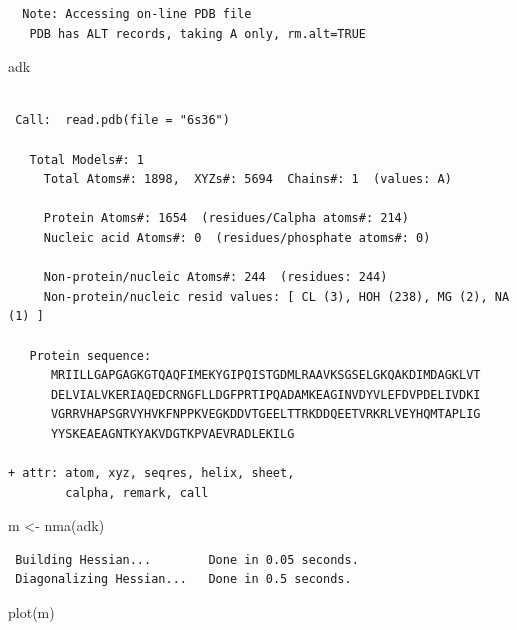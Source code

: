 \documentclass[
  letterpaper,
  DIV=11,
  numbers=noendperiod]{scrartcl}
\newenvironment{Shaded}{\begin{snugshade}}{\end{snugshade}}
\newcommand{\FunctionTok}[1]{\textcolor[rgb]{0.28,0.35,0.67}{#1}}
\newcommand{\NormalTok}[1]{\textcolor[rgb]{0.00,0.23,0.31}{#1}}
\newcommand{\OtherTok}[1]{\textcolor[rgb]{0.00,0.23,0.31}{#1}}
\begin{document}
\begin{verbatim}
  Note: Accessing on-line PDB file
   PDB has ALT records, taking A only, rm.alt=TRUE
\end{verbatim}

\begin{Shaded}
\begin{Highlighting}[]
\NormalTok{adk}
\end{Highlighting}
\end{Shaded}

\begin{verbatim}

 Call:  read.pdb(file = "6s36")

   Total Models#: 1
     Total Atoms#: 1898,  XYZs#: 5694  Chains#: 1  (values: A)

     Protein Atoms#: 1654  (residues/Calpha atoms#: 214)
     Nucleic acid Atoms#: 0  (residues/phosphate atoms#: 0)

     Non-protein/nucleic Atoms#: 244  (residues: 244)
     Non-protein/nucleic resid values: [ CL (3), HOH (238), MG (2), NA (1) ]

   Protein sequence:
      MRIILLGAPGAGKGTQAQFIMEKYGIPQISTGDMLRAAVKSGSELGKQAKDIMDAGKLVT
      DELVIALVKERIAQEDCRNGFLLDGFPRTIPQADAMKEAGINVDYVLEFDVPDELIVDKI
      VGRRVHAPSGRVYHVKFNPPKVEGKDDVTGEELTTRKDDQEETVRKRLVEYHQMTAPLIG
      YYSKEAEAGNTKYAKVDGTKPVAEVRADLEKILG

+ attr: atom, xyz, seqres, helix, sheet,
        calpha, remark, call
\end{verbatim}

\begin{Shaded}
\begin{Highlighting}[]
\NormalTok{m }\OtherTok{\textless{}{-}} \FunctionTok{nma}\NormalTok{(adk)}
\end{Highlighting}
\end{Shaded}

\begin{verbatim}
 Building Hessian...        Done in 0.05 seconds.
 Diagonalizing Hessian...   Done in 0.5 seconds.
\end{verbatim}

\begin{Shaded}
\begin{Highlighting}[]
\FunctionTok{plot}\NormalTok{(m)}
\end{Highlighting}
\end{Shaded}
\end{document}
